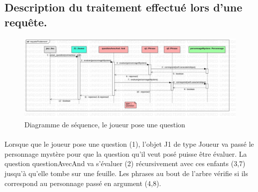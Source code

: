 \documentclass[a4paper]{article}
\begin{document}
\subsection*{Description du traitement effectué lors d'une requête.}
\begin{figure}
  \caption{Diagramme de séquence, le joueur pose une question}
  \centering
  \includegraphics[scale=0.38]{./requeteTraitement.jpg}
\end{figure}

\paragraph*{}Lorsque que le joueur pose une question (1), l'objet J1 de type Joueur va passé le personnage mystère pour que la question qu'il veut posé puisse être évaluer.
La question questionAvecAnd va s'évaluer (2) récursivement avec ces enfants (3,7) jusqu'à qu'elle tombe sur une feuille. Les phrases au bout de l'arbre vérifie si ils correspond au personnage passé en argument (4,8).
\clearpage
\end{document}
